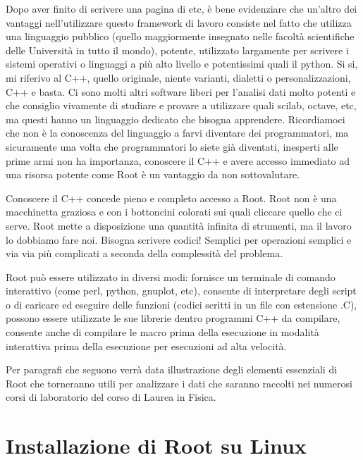 \documentclass[11pt,fleqn]{book} %
\begin{document}
Dopo aver finito di scrivere una pagina di etc, è bene evidenziare che un'altro dei vantaggi nell'utilizzare questo framework di lavoro consiste nel fatto che utilizza una linguaggio pubblico (quello maggiormente insegnato nelle facoltà scientifiche delle Università in tutto il mondo), potente, utilizzato largamente per scrivere i sistemi operativi o linguaggi a più alto livello e potentissimi quali il python. Si si, mi riferivo al C++, quello originale, niente varianti, dialetti o personalizzazioni, C++ e basta. Ci sono molti altri software liberi per l'analisi dati molto potenti e che consiglio vivamente di studiare e provare a utilizzare quali scilab, octave, etc, ma questi hanno un linguaggio dedicato che bisogna apprendere.
Ricordiamoci che non è la conoscenza del linguaggio a farvi diventare dei programmatori, ma sicuramente una volta che programmatori lo siete già diventati, inesperti alle prime armi non ha importanza, conoscere il C++ e avere accesso immediato ad una risorsa potente come Root è un vantaggio da non sottovalutare.

Conoscere il C++ concede pieno e completo accesso a Root. Root non è una macchinetta graziosa e con i bottoncini colorati sui quali cliccare quello che ci serve. Root mette a disposizione una quantità infinita di strumenti, ma il lavoro lo dobbiamo fare noi. Bisogna scrivere codici! Semplici per operazioni semplici e via via più complicati a seconda della complessità del problema.

Root può essere utilizzato in diversi modi: fornisce un terminale di comando interattivo (come perl, python, gnuplot, etc), consente di interpretare degli script o di caricare ed eseguire delle funzioni (codici scritti in un file con estensione .C), possono essere utilizzate le sue librerie dentro programmi C++ da compilare, consente anche di compilare le macro prima della esecuzione in modalità interattiva prima della esecuzione per esecuzioni ad alta velocità.

Per paragrafi che seguono verrà data illustrazione degli elementi essenziali di Root che torneranno utili per analizzare i dati che saranno raccolti nei numerosi corsi di laboratorio del corso di Laurea in Fisica.

\section{Installazione di Root su Linux}
\end{document}
